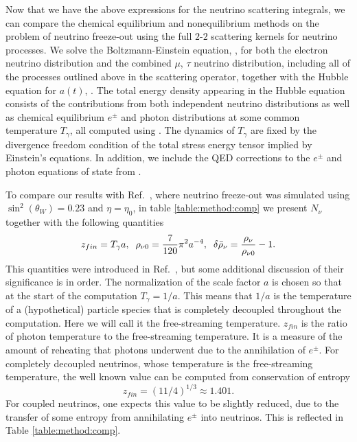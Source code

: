 
Now that we have the above expressions for the neutrino scattering integrals, we can compare the chemical equilibrium and nonequilibrium methods on the problem of neutrino freeze-out using the full $2$-$2$ scattering kernels for neutrino processes.  We solve the Boltzmann-Einstein equation, , for both the electron neutrino distribution and the combined $\mu$, $\tau$ neutrino distribution, including all of the  processes outlined above in the scattering operator, together with the Hubble equation for $a(t)$, .  The total energy density  appearing in the Hubble equation consists of the contributions from both independent neutrino distributions as well as chemical equilibrium $e^\pm$ and photon distributions at some common temperature $T_\gamma$, all computed using .  The dynamics of $T_\gamma$ are fixed by the divergence freedom condition of the total stress energy tensor implied by Einstein's equations.  In addition, we include the QED corrections to the $e^\pm$ and photon equations of state from  .%

To compare our results with Ref.~\cite{Mangano:2005cc}, where neutrino freeze-out was simulated using $\sin^2(\theta_W)=0.23$ and $\eta=\eta_0$, in table \ref{table:method:comp} we present $N_\nu$ together with the following quantities
\begin{align}
 z_{fin}=T_\gamma a,\hspace{2mm}  \rho_{\nu 0}=\frac{7}{120}\pi^2a^{-4}, \hspace{2mm}  \delta\bar\rho_{\nu}= \frac{\rho_\nu}{\rho_{\nu 0}}-1.
\end{align}
This quantities were introduced in Ref.~\cite{Mangano:2005cc}, but some additional discussion of their significance is in order.  The normalization of the scale factor $a$ is chosen so that at the start of the computation $T_\gamma=1/a$.  This means that $1/a$ is the temperature of a (hypothetical) particle species that is completely decoupled throughout the computation.  Here we will call it the free-streaming temperature.   $z_{fin}$ is the ratio of photon temperature to the free-streaming temperature.  It is a measure of the amount of reheating that photons underwent due to the annihilation of $e^\pm$.  For completely decoupled neutrinos, whose temperature is the free-streaming temperature, the well known value can be computed from conservation of entropy
\begin{equation}
z_{fin}=(11/4)^{1/3}\approx 1.401.
\end{equation}
For coupled neutrinos, one expects this value to be slightly reduced, due to the  transfer of some entropy from annihilating $e^\pm$ into neutrinos. This is reflected in Table \ref{table:method:comp}.


